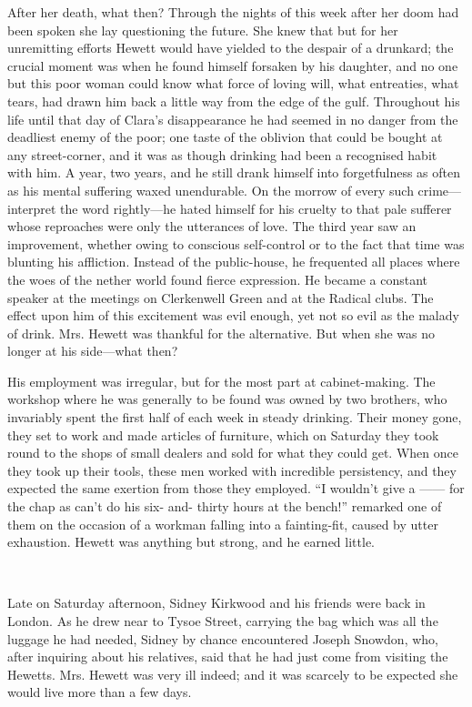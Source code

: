 After her death, what then? Through the nights of this week after her
doom had been spoken she lay questioning the future. She knew that but
for her unremitting efforts Hewett would have yielded to the despair of
a drunkard; the crucial moment was when he found himself forsaken by his
daughter, and no one but this poor woman could know what force of loving
will, what entreaties, what tears, had drawn him back a little way from
the edge of the gulf. Throughout his life until that day of Clara's
disappearance he had seemed in no danger from the deadliest enemy of the
poor; one taste of the oblivion that could be bought at any
street-corner, and it was as though drinking had been a recognised habit
with him. A year, two years, and he still drank himself into
forgetfulness as often as his mental suffering waxed
{\protect\hypertarget{163}{}{}}unendurable. On the morrow of every such
crime---interpret the word rightly---he hated himself for his cruelty to
that pale sufferer whose reproaches were only the utterances of love.
The third year saw an improvement, whether owing to conscious
self-control or to the fact that time was blunting his affliction.
Instead of the public-house, he frequented all places where the woes of
the nether world found fierce expression. He became a constant speaker
at the meetings on Clerkenwell Green and at the Radical clubs. The
effect upon him of this excitement was evil enough, yet not so evil as
the malady of drink. Mrs. Hewett was thankful for the alternative. But
when she was no longer at his side---what then?

His employment was irregular, but for the most part at cabinet-making.
The workshop where he was generally to be found was owned by two
brothers, who invariably spent the first half of each week in steady
drinking. Their money gone, they set to work and made articles of
furniture, which on Saturday they took round to the shops of small
dealers {\protect\hypertarget{164}{}{}}and sold for what they could get.
When once they took up their tools, these men worked with incredible
persistency, and they expected the same exertion from those they
employed. ``I wouldn't give {a {{------}}} for the chap as can't do his
six- and- thirty hours at the bench!'' remarked one of them on the
occasion of a workman falling into a fainting-fit, caused by utter
exhaustion. Hewett was anything but strong, and he earned little.

~

Late on Saturday afternoon, Sidney Kirkwood and his friends were back in
London. As he drew near to Tysoe Street, carrying the bag which was all
the luggage he had needed, Sidney by chance encountered Joseph Snowdon,
who, after inquiring about his relatives, said that he had just come
from visiting the Hewetts. Mrs. Hewett was very ill indeed; and it was
scarcely to be expected she would live more than a few days.

